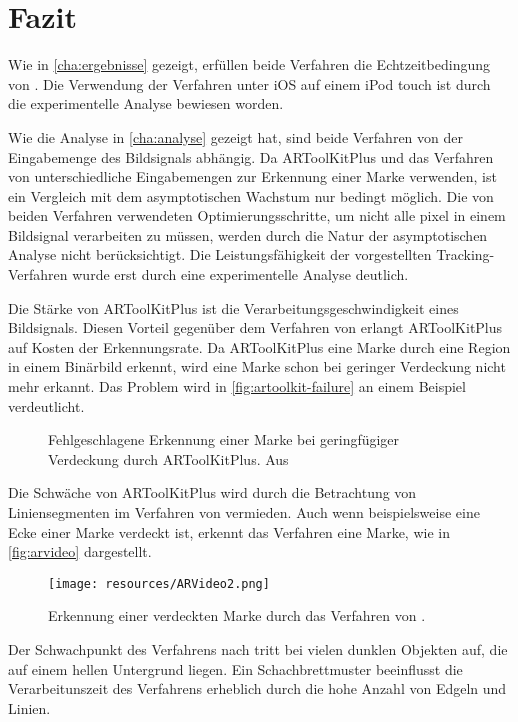 \chapter{Fazit} %
\label{cha:fazit}

Wie in \autoref{cha:ergebnisse} gezeigt, erfüllen beide Verfahren die Echtzeitbedingung von \citeauthor{azuma97}. Die
 Verwendung der Verfahren unter iOS auf einem iPod touch ist durch die experimentelle Analyse bewiesen worden.

Wie die Analyse in \autoref{cha:analyse} gezeigt hat, sind beide Verfahren von der Eingabemenge des Bildsignals
 abhängig. Da ARToolKitPlus und das Verfahren von \citeauthor{hirzer08} unterschiedliche Eingabemengen zur Erkennung
 einer Marke verwenden, ist ein Vergleich mit dem asymptotischen Wachstum nur bedingt möglich. Die von beiden Verfahren
 verwendeten Optimierungsschritte, um nicht alle \gls{pixel} in einem Bildsignal verarbeiten zu müssen, werden durch
 die Natur der asymptotischen Analyse nicht berücksichtigt. Die Leistungsfähigkeit der vorgestellten Tracking-Verfahren
 wurde erst durch eine experimentelle Analyse deutlich.

Die Stärke von ARToolKitPlus ist die Verarbeitungsgeschwindigkeit eines Bildsignals. Diesen Vorteil gegenüber dem
 Verfahren von \citeauthor{hirzer08} erlangt ARToolKitPlus auf Kosten der Erkennungsrate. Da ARToolKitPlus eine Marke
 durch eine Region in einem Binärbild erkennt, wird eine Marke schon bei geringer Verdeckung nicht mehr erkannt. Das
 Problem wird in \autoref{fig:artoolkit-failure} an einem Beispiel verdeutlicht.
\begin{figure}[!ht]
	\centering
	\caption{Fehlgeschlagene Erkennung einer Marke bei geringfügiger Verdeckung durch ARToolKitPlus. Aus
	 \cite{fiala2004artagb}}
	\label{fig:artoolkit-failure}
\end{figure}

Die Schwäche von ARToolKitPlus wird durch die Betrachtung von Liniensegmenten im Verfahren von \citeauthor{hirzer08}
 vermieden. Auch wenn beispielsweise eine Ecke einer Marke verdeckt ist, erkennt das Verfahren eine Marke, wie in
 \autoref{fig:arvideo} dargestellt.
\begin{figure}[!ht]
	\centering
	\texttt{[image: resources/ARVideo2.png]}
	\caption{Erkennung einer verdeckten Marke durch das Verfahren von \citeauthor{hirzer08}.}
	\label{fig:arvideo}
\end{figure}
Der Schwachpunkt des Verfahrens nach \citeauthor{hirzer08} tritt bei vielen dunklen Objekten auf, die auf einem hellen
 Untergrund liegen. Ein Schachbrettmuster beeinflusst die Verarbeitunszeit des Verfahrens erheblich durch die hohe
 Anzahl von Edgeln und Linien.

